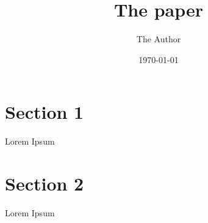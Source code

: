 \documentclass[11pt]{article}
\title{The paper}
\author{ The Author }
\date{\today}
\begin{document}
\maketitle
\pagebreak



\section{Section 1}

Lorem Ipsum


\pagebreak

\section{Section 2}

Lorem Ipsum \\

\end{document}
